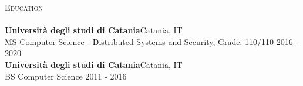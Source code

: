 \documentclass[a4paper]{article}
\newcommand{\lineunder} {
    \vspace*{-8pt} \\
    \hspace*{-18pt} \hrulefill \\
}
\newcommand{\header} [1] {
    {\hspace*{-18pt}\vspace*{6pt} \textsc{#1}}
    \vspace*{-6pt} \lineunder
}
\begin{document}
\header{Education}
\textbf{Università degli studi di Catania}\hfill Catania, IT\\
MS Computer Science - Distributed Systems and Security, Grade: 110/110 \hfill 2016 - 2020\\
\vspace{2mm}
\textbf{Università degli studi di Catania}\hfill Catania, IT\\
BS Computer Science \hfill 2011 - 2016\\
\vspace{2mm}



\ 
\end{document}
